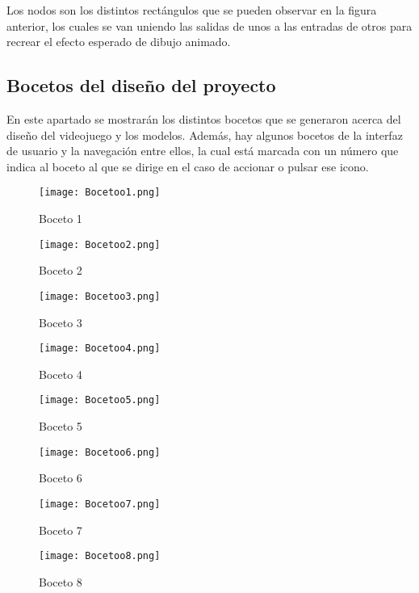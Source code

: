 Los nodos son los distintos rectángulos que se pueden observar en la figura anterior, los cuales se van uniendo las salidas de unos a las entradas de otros para recrear el efecto esperado de dibujo animado.

\subsection{Bocetos del diseño del proyecto}

En este apartado se mostrarán los distintos bocetos que se generaron acerca del diseño del videojuego y los modelos. Además, hay algunos bocetos de la interfaz de usuario y la navegación entre ellos, la cual está marcada con un número que indica al boceto al que se dirige en el caso de accionar o pulsar ese icono.

\begin{figure}[H]
    \centering
    \texttt{[image: Bocetoo1.png]}
    \caption{Boceto 1}
\end{figure}

\begin{figure}[H]
    \centering
    \texttt{[image: Bocetoo2.png]}
    \caption{Boceto 2}
\end{figure}

\begin{figure}[H]
    \centering
    \texttt{[image: Bocetoo3.png]}
    \caption{Boceto 3}
\end{figure}

\begin{figure}[H]
    \centering
    \texttt{[image: Bocetoo4.png]}
    \caption{Boceto 4}
\end{figure}

\begin{figure}[H]
    \centering
    \texttt{[image: Bocetoo5.png]}
    \caption{Boceto 5}
\end{figure}

\begin{figure}[H]
    \centering
    \texttt{[image: Bocetoo6.png]}
    \caption{Boceto 6}
\end{figure}

\begin{figure}[H]
    \centering
    \texttt{[image: Bocetoo7.png]}
    \caption{Boceto 7}
\end{figure}

\begin{figure}[H]
    \centering
    \texttt{[image: Bocetoo8.png]}
    \caption{Boceto 8}
\end{figure}

